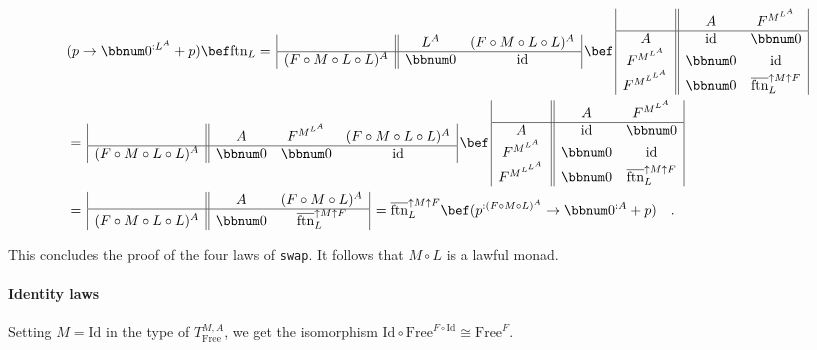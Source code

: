 \begin{align*}
 & (p\rightarrow\bbnum 0^{:L^{A}}+p)\bef\text{ftn}_{L}=\,\begin{array}{|c||cc|}
 & L^{A} & (F\circ M\circ L\circ L)^{A}\\
\hline (F\circ M\circ L\circ L)^{A} & \bbnum 0 & \text{id}
\end{array}\,\bef\,\begin{array}{|c||cc|}
 & A & F^{M^{L^{A}}}\\
\hline A & \text{id} & \bbnum 0\\
F^{M^{L^{A}}} & \bbnum 0 & \text{id}\\
F^{M^{L^{L^{A}}}} & \bbnum 0 & \overline{\text{ftn}}_{L}^{\uparrow M\uparrow F}
\end{array}\\
 & =\,\begin{array}{|c||ccc|}
 & A & F^{M^{L^{A}}} & (F\circ M\circ L\circ L)^{A}\\
\hline (F\circ M\circ L\circ L)^{A} & \bbnum 0 & \bbnum 0 & \text{id}
\end{array}\,\bef\,\begin{array}{|c||cc|}
 & A & F^{M^{L^{A}}}\\
\hline A & \text{id} & \bbnum 0\\
F^{M^{L^{A}}} & \bbnum 0 & \text{id}\\
F^{M^{L^{L^{A}}}} & \bbnum 0 & \overline{\text{ftn}}_{L}^{\uparrow M\uparrow F}
\end{array}\\
 & =\,\begin{array}{|c||cc|}
 & A & (F\circ M\circ L)^{A}\\
\hline (F\circ M\circ L\circ L)^{A} & \bbnum 0 & \overline{\text{ftn}}_{L}^{\uparrow M\uparrow F}
\end{array}\,=\overline{\text{ftn}}_{L}^{\uparrow M\uparrow F}\bef(p^{:(F\circ M\circ L)^{A}}\rightarrow\bbnum 0^{:A}+p)\quad.
\end{align*}

This concludes the proof of the four laws of \lstinline!swap!. It
follows that $M\circ L$ is a lawful monad.

\paragraph{Identity laws}

Setting $M=\text{Id}$ in the type of $T_{\text{Free}}^{M,A}$, we
get the isomorphism $\text{Id}\circ\text{Free}^{F\circ\text{Id}}\cong\text{Free}^{F}$.

